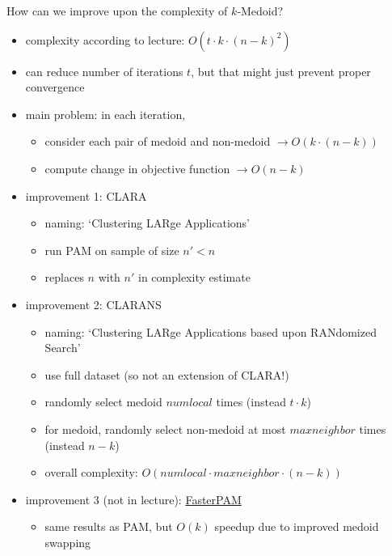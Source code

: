 \documentclass[12pt]{article}
\begin{document}
\pagebreak

\begin{question}
	How can we improve upon the complexity of $k$-Medoid?
\end{question}

\begin{itemize}[left=0pt, nosep]
	\item complexity according to lecture: $O(t \cdot k \cdot (n-k)^2)$
	\item can reduce number of iterations $t$, but that might just prevent proper convergence
	\item main problem: in each iteration,
	\begin{itemize}[left=0pt, nosep]
		\item consider each pair of medoid and non-medoid $\rightarrow O(k \cdot (n-k))$
		\item compute change in objective function $\rightarrow O(n-k)$
	\end{itemize}
	\item improvement 1: CLARA
	\begin{itemize}[left=0pt, nosep]
		\item naming: `Clustering LARge Applications'
		\item run PAM on sample of size $n' < n$
		\item replaces $n$ with $n'$ in complexity estimate
	\end{itemize}
	\item improvement 2: CLARANS
	\begin{itemize}[left=0pt, nosep]
		\item naming: `Clustering LARge Applications based upon RANdomized Search'
		\item use full dataset (so not an extension of CLARA!)
		\item randomly select medoid $numlocal$ times (instead $t \cdot k$)
		\item for medoid, randomly select non-medoid at most $maxneighbor$ times (instead $n-k$)
		\item overall complexity: $O(numlocal \cdot maxneighbor \cdot (n-k))$
	\end{itemize}
	\item improvement 3 (not in lecture): \href{https://doi.org/10.1016/j.is.2021.101804}{FasterPAM}
	\begin{itemize}[left=0pt, nosep]
		\item same results as PAM, but $O(k)$ speedup due to improved medoid swapping
	\end{itemize}
\end{itemize}
\end{document}
